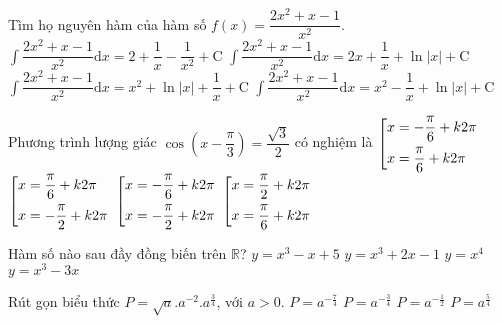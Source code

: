 \begin{ex}%
Tìm họ nguyên hàm của hàm số $f(x)=\dfrac{2x^2+x-1}{x^2}$.
\choice
{$\displaystyle \int \dfrac{2x^2+x-1}{x^2} \mathrm{d}x = 2+ \dfrac{1}{x} - \dfrac{1}{x^2} + \mathrm{C}$}
{\True $\displaystyle \int \dfrac{2x^2+x-1}{x^2} \mathrm{d}x = 2x + \dfrac{1}{x} +\ln |x| + \mathrm{C}$}
{$\displaystyle \int \dfrac{2x^2+x-1}{x^2} \mathrm{d}x = x^2+ \ln |x| + \dfrac{1}{x} + \mathrm{C}$}
{$\displaystyle \int \dfrac{2x^2+x-1}{x^2} \mathrm{d}x = x^2 - \dfrac{1}{x} + \ln |x| + \mathrm{C}$}
\end{ex}

\begin{ex}%
Phương trình lượng giác $\cos \left(x - \dfrac{\pi}{3}\right) = \dfrac{\sqrt{3}}{2}$ có nghiệm là
\choice
{$\left[\begin{aligned}& x = -\dfrac{\pi}{6} + k2\pi \\ & x = \dfrac{\pi}{6} + k2\pi \end{aligned}\right.$}
{$\left[\begin{aligned}& x = \dfrac{\pi}{6} + k2\pi \\ & x = -\dfrac{\pi}{2} + k2\pi \end{aligned}\right.$}
{$\left[\begin{aligned}& x = -\dfrac{\pi}{6} + k2\pi \\ & x = -\dfrac{\pi}{2} + k2\pi \end{aligned}\right.$}
{\True $\left[\begin{aligned}& x = \dfrac{\pi}{2} + k2\pi \\ & x = \dfrac{\pi}{6} + k2\pi \end{aligned}\right.$}
\end{ex}

\begin{ex}%
Hàm số nào sau đầy đồng biến trên $\mathbb{R}$?
\choice
{$y=x^3-x+5$}
{\True $y=x^3+2x-1$}
{$y=x^4$}
{$y=x^3-3x$}
\end{ex}

\begin{ex}%
Rút gọn biểu thức $P = \sqrt{a}. a^{-2} . a^{\frac{3}{4}}$, với $a>0$.
\choice
{$ P=a^{-\frac{7}{4}}$}
{\True $P=a^{-\frac{3}{4}}$}
{$P=a^{-\frac{1}{2}}$}
{$P=a^{\frac{5}{4}}$}
\end{ex}

